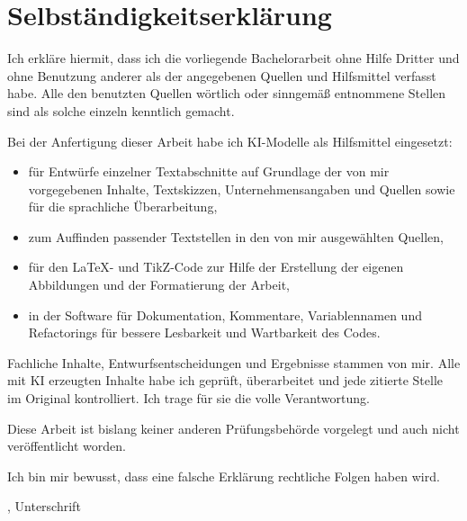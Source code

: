 
\chapter*{Selbständigkeitserklärung}
\label{sec:Selbständigkeitserklärung}

Ich erkläre hiermit, dass ich die vorliegende Bachelorarbeit ohne Hilfe Dritter und ohne Benutzung anderer als der angegebenen Quellen und Hilfsmittel verfasst habe. Alle den benutzten Quellen wörtlich oder sinngemäß entnommene Stellen sind als solche einzeln kenntlich gemacht.

Bei der Anfertigung dieser Arbeit habe ich KI-Modelle als Hilfsmittel eingesetzt:
\begin{itemize}
  \item für Entwürfe einzelner Textabschnitte auf Grundlage der von mir
        vorgegebenen Inhalte, Textskizzen, Unternehmensangaben und Quellen sowie für die
        sprachliche Überarbeitung,
  \item zum Auffinden passender Textstellen in den von mir ausgewählten
        Quellen,
  \item für den LaTeX- und TikZ-Code zur Hilfe der Erstellung der eigenen Abbildungen und der
        Formatierung der Arbeit,
  \item in der Software für Dokumentation, Kommentare, Variablennamen und Refactorings für bessere Lesbarkeit und Wartbarkeit des Codes.
\end{itemize}
Fachliche Inhalte, Entwurfsentscheidungen und Ergebnisse stammen von mir.
Alle mit KI erzeugten Inhalte habe ich geprüft, überarbeitet und jede
zitierte Stelle im Original kontrolliert. Ich trage für sie die volle
Verantwortung.

Diese Arbeit ist bislang keiner anderen Prüfungsbehörde vorgelegt und auch nicht veröffentlicht worden.

Ich bin mir bewusst, dass eine falsche Erklärung rechtliche Folgen haben wird.\\[1.5cm]


\begin{minipage}{0.7\textwidth}
\ort, \abgabedatum \hfill  Unterschrift
\end{minipage}



